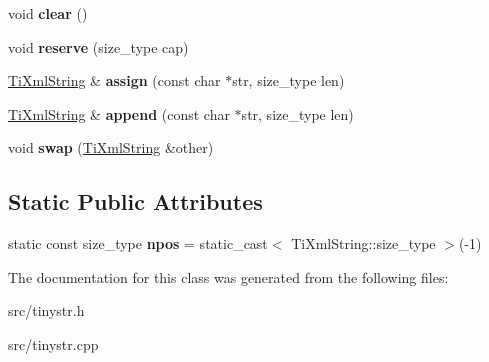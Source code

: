 \begin{DoxyCompactItemize}
\item 
\hypertarget{classTiXmlString_ab20e06e4c666abf3bdbfb3a1191d4888}{
void {\bfseries clear} ()}
\label{d1/d15/classTiXmlString_ab20e06e4c666abf3bdbfb3a1191d4888}

\item 
\hypertarget{classTiXmlString_a88ecf9f0f00cb5c67b6b637958d7049c}{
void {\bfseries reserve} (size\-\_\-type cap)}
\label{d1/d15/classTiXmlString_a88ecf9f0f00cb5c67b6b637958d7049c}

\item 
\hypertarget{classTiXmlString_ac72f3d9149b7812c1e6c59402014d0d5}{
\hyperlink{classTiXmlString}{\-Ti\-Xml\-String} \& {\bfseries assign} (const char $\ast$str, size\-\_\-type len)}
\label{d1/d15/classTiXmlString_ac72f3d9149b7812c1e6c59402014d0d5}

\item 
\hypertarget{classTiXmlString_ad44b21700d2ec24a511367b222b643fb}{
\hyperlink{classTiXmlString}{\-Ti\-Xml\-String} \& {\bfseries append} (const char $\ast$str, size\-\_\-type len)}
\label{d1/d15/classTiXmlString_ad44b21700d2ec24a511367b222b643fb}

\item 
\hypertarget{classTiXmlString_aa392cbc180752a79f007f4f9280c7762}{
void {\bfseries swap} (\hyperlink{classTiXmlString}{\-Ti\-Xml\-String} \&other)}
\label{d1/d15/classTiXmlString_aa392cbc180752a79f007f4f9280c7762}

\end{DoxyCompactItemize}
\subsection*{\-Static \-Public \-Attributes}
\begin{DoxyCompactItemize}
\item 
\hypertarget{classTiXmlString_a8f4422d227088dc7bec96f479b275d0a}{
static const size\-\_\-type {\bfseries npos} = static\-\_\-cast$<$ \-Ti\-Xml\-String\-::size\-\_\-type $>$(-\/1)}
\label{d1/d15/classTiXmlString_a8f4422d227088dc7bec96f479b275d0a}

\end{DoxyCompactItemize}


\-The documentation for this class was generated from the following files\-:\begin{DoxyCompactItemize}
\item 
src/tinystr.\-h\item 
src/tinystr.\-cpp\end{DoxyCompactItemize}

